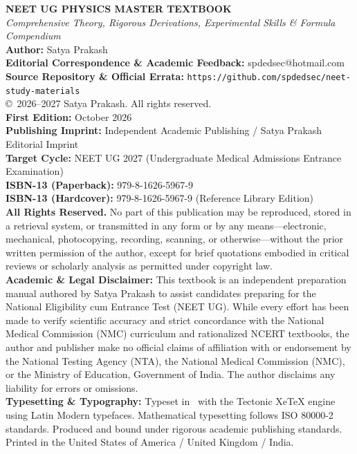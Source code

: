 \documentclass[10pt,twoside,openright]{book}
\begin{document}
\thispagestyle{empty}
\vspace*{\fill}
\begin{flushleft}
{\small
\textbf{NEET UG PHYSICS MASTER TEXTBOOK}\\[2pt]
\textit{Comprehensive Theory, Rigorous Derivations, Experimental Skills \& Formula Compendium}\\[8pt]
\textbf{Author:} Satya Prakash\\
\textbf{Editorial Correspondence \& Academic Feedback:} spdedsec@hotmail.com\\
\textbf{Source Repository \& Official Errata:} \nolinkurl{https://github.com/spdedsec/neet-study-materials}\\[10pt]

\copyright\ 2026--2027 Satya Prakash. All rights reserved.\\[8pt]

\textbf{First Edition:} October 2026\\
\textbf{Publishing Imprint:} Independent Academic Publishing / Satya Prakash Editorial Imprint\\
\textbf{Target Cycle:} NEET UG 2027 (Undergraduate Medical Admissions Entrance Examination)\\
\textbf{ISBN-13 (Paperback):} 979-8-1626-5967-9\\
\textbf{ISBN-13 (Hardcover):} 979-8-1626-5967-9 (Reference Library Edition)\\[10pt]

\textbf{All Rights Reserved.} No part of this publication may be reproduced, stored in a retrieval system, or transmitted in any form or by any means---electronic, mechanical, photocopying, recording, scanning, or otherwise---without the prior written permission of the author, except for brief quotations embodied in critical reviews or scholarly analysis as permitted under copyright law.\\[8pt]

\textbf{Academic \& Legal Disclaimer:} This textbook is an independent preparation manual authored by Satya Prakash to assist candidates preparing for the National Eligibility cum Entrance Test (NEET UG). While every effort has been made to verify scientific accuracy and strict concordance with the National Medical Commission (NMC) curriculum and rationalized NCERT textbooks, the author and publisher make no official claims of affiliation with or endorsement by the National Testing Agency (NTA), the National Medical Commission (NMC), or the Ministry of Education, Government of India. The author disclaims any liability for errors or omissions.\\[8pt]

\textbf{Typesetting \& Typography:} Typeset in \LaTeXe\ with the Tectonic XeTeX engine using Latin Modern typefaces. Mathematical typesetting follows ISO 80000-2 standards. Produced and bound under rigorous academic publishing standards.\\[4pt]
Printed in the United States of America / United Kingdom / India.
}
\end{flushleft}
\cleardoublepage
\end{document}
